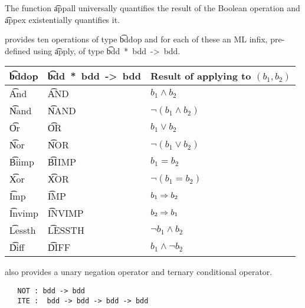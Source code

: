 The function \t{appall} universally quantifies the result of the
Boolean operation and \t{appex} existentially quantifies it.

\Muddy{} provides ten operations of type \t{bddop} and for each of
these an ML infix, pre-defined using \t{apply}, of type \t{bdd~*~bdd~->~bdd}.



\begin{center}

\begin{tabular}{|l||l|l|} \hline
\t{bddop}\index{HolBddLib!ML bindings!{bddop}@\ml{bddop}} & \t{bdd~*~bdd~->~bdd} & Result of applying to $(b_1,b_2)$\\ \hline\hline
\t{And}\index{HolBddLib!ML bindings!{And}@\ml{And}} & \t{AND} & $b_1\wedge b_2$ \\ \hline
\t{Nand}\index{HolBddLib!ML bindings!{Nand}@\ml{Nand}} & \t{NAND} & $\neg(b_1\wedge b_2)$ \\ \hline
\t{Or}\index{HolBddLib!ML bindings!{Or}@\ml{Or}}  & \t{OR} & $b_1\vee b_2$ \\ \hline
\t{Nor}\index{HolBddLib!ML bindings!{Nor}@\ml{Nor}} & \t{NOR} & $\neg(b_1\vee b_2)$ \\ \hline
\t{Biimp}\index{HolBddLib!ML bindings!{Biimp}@\ml{Biimp}} & \t{BIIMP} & $b_1= b_2$ \\ \hline
\t{Xor}\index{HolBddLib!ML bindings!{Xor}@\ml{Xor}} & \t{XOR} & $\neg(b_1=b_2)$ \\ \hline
\t{Imp}\index{HolBddLib!ML bindings!{Imp}@\ml{Imp}} & \t{IMP} & $b_1\Rightarrow b_2$ \\ \hline
\t{Invimp}\index{HolBddLib!ML bindings!{Invimp}@\ml{Invimp}} & \t{INVIMP} & $b_2\Rightarrow b_1$ \\ \hline
\t{Lessth}\index{HolBddLib!ML bindings!{Lessth}@\ml{Lessth}} & \t{LESSTH} & $\neg b_1\wedge b_2$ \\ \hline
\t{Diff}\index{HolBddLib!ML bindings!{Diff}@\ml{Diff}} & \t{DIFF} & $b_1\wedge \neg b_2$ \\ \hline
\end{tabular}\label{bddops}

\end{center}

\Muddy{} also provides a unary negation operator and ternary conditional operator.

\begin{verbatim}
   NOT : bdd -> bdd
   ITE :  bdd -> bdd -> bdd -> bdd
\end{verbatim}


